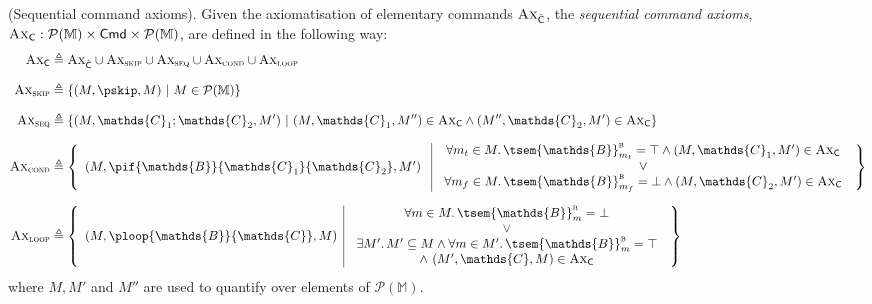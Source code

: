 \begin{defn}
	(Sequential command axioms).
	Given the axiomatisation of elementary commands $\textsc{Ax}_{\hat{\mathsf{C}}}$, the \emph{sequential command axioms}, $\textsc{Ax}_\mathsf{C} : \mathcal{P}(\mathbb{M}) \times \mathsf{Cmd} \times \mathcal{P}(\mathbb{M})$, are defined in the following way:
	\begin{align*}
		\textsc{Ax}_\mathsf{C} &\triangleq \textsc{Ax}_{\hat{\mathsf{C}}} \cup \textsc{Ax}_{\textsc{skip}} \cup \textsc{Ax}_{\textsc{seq}} \cup \textsc{Ax}_{\textsc{cond}} \cup \textsc{Ax}_{\textsc{loop}}
		\\[0.7em]
		\textsc{Ax}_{\textsc{skip}} &\triangleq \{ (M, \pskip, M)\ |\ M \in \mathcal{P}(\mathbb{M}) \}
		\\[0.7em]
		\textsc{Ax}_{\textsc{seq}} &\triangleq \{ (M, \mathds{C}_1 ; \mathds{C}_2, M')\ |\ (M, \mathds{C}_1, M'') \in \textsc{Ax}_\mathsf{C} \land (M'', \mathds{C}_2, M') \in \textsc{Ax}_\mathsf{C} \}
		\\[0.7em]
		\textsc{Ax}_{\textsc{cond}}
			&\triangleq \left\{ 
				\begin{array}{r | l}
					(M, \pif{\mathds{B}}{\mathds{C}_1}{\mathds{C}_2}, M')\ 
					&
					\begin{array}{c}
						\forall m_t \in M \ldotp \tsem{\mathds{B}}^\textsc{b}_{m_t} = \top \land (M, \mathds{C}_1, M') \in \textsc{Ax}_\mathsf{C}
						\\
						\lor
						\\
						\forall m_f \in M \ldotp \tsem{\mathds{B}}^\textsc{b}_{m_f} = \bot \land (M, \mathds{C}_2, M') \in \textsc{Ax}_\mathsf{C}
					\end{array}
				\end{array}
			\right\}
		\\[0.7em]
		\textsc{Ax}_{\textsc{loop}}
			&\triangleq
				\left\{
				\begin{array}{r | l}
					(M, \ploop{\mathds{B}}{\mathds{C}}, M)
					&
					\begin{array}{c}
						\forall m \in M \ldotp \tsem{\mathds{B}}^\textsc{b}_{m} = \bot
						\\
						\lor
						\\
						\exists M' \ldotp M' \subseteq M \land \forall m \in M' \ldotp \tsem{\mathds{B}}^\textsc{b}_{m} = \top \\
						\land\ (M', \mathds{C}, M) \in \textsc{Ax}_\mathsf{C}
					\end{array}
				\end{array}	 
				\right\}
	\end{align*}
	where $M, M'$ and $M''$ are used to quantify over elements of $\mathcal{P}(\mathbb{M})$.
\end{defn}
